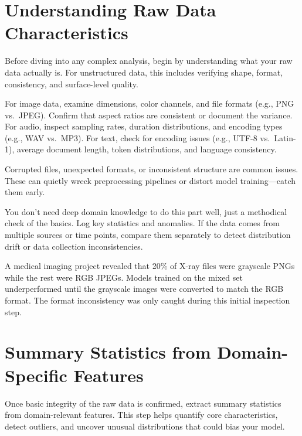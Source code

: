 \documentclass[12pt,openany]{book}
\begin{document}
\section{Understanding Raw Data Characteristics}

Before diving into any complex analysis, begin by understanding what your raw data actually is. For unstructured data, this includes verifying shape, format, consistency, and surface-level quality.
\newline

For image data, examine dimensions, color channels, and file formats (e.g., PNG vs.\ JPEG). Confirm that aspect ratios are consistent or document the variance. For audio, inspect sampling rates, duration distributions, and encoding types (e.g., WAV vs.\ MP3). For text, check for encoding issues (e.g., UTF-8 vs.\ Latin-1), average document length, token distributions, and language consistency.
\newline

Corrupted files, unexpected formats, or inconsistent structure are common issues. These can quietly wreck preprocessing pipelines or distort model training—catch them early.
\newline

You don’t need deep domain knowledge to do this part well, just a methodical check of the basics. Log key statistics and anomalies. If the data comes from multiple sources or time points, compare them separately to detect distribution drift or data collection inconsistencies.

\begin{examplebox}
A medical imaging project revealed that 20\% of X-ray files were grayscale PNGs while the rest were RGB JPEGs. Models trained on the mixed set underperformed until the grayscale images were converted to match the RGB format. The format inconsistency was only caught during this initial inspection step.
\end{examplebox}


\section{Summary Statistics from Domain-Specific Features}

Once basic integrity of the raw data is confirmed, extract summary statistics from domain-relevant features. This step helps quantify core characteristics, detect outliers, and uncover unusual distributions that could bias your model.
\newline
\end{document}
